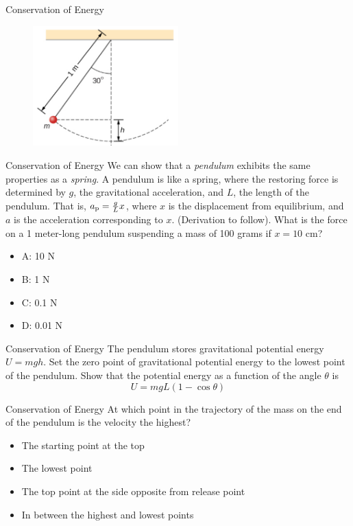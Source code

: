 \documentclass{beamer}
\begin{document}
\begin{frame}{Conservation of Energy}
\begin{figure}
\centering
\includegraphics[width=0.5\textwidth]{figures/pend.png}
\end{figure}
\end{frame}

\begin{frame}{Conservation of Energy}
We can show that a \textit{pendulum} exhibits the same properties as a \textit{spring}.  A pendulum is like a spring, where the restoring force is determined by $g$, the gravitational acceleration, and $L$, the length of the pendulum.  That is, $a_{\rm p} = \frac{g}{L}x$, where $x$ is the displacement from equilibrium, and $a$ is the acceleration corresponding to $x$.  (Derivation to follow).  What is the force on a 1 meter-long pendulum suspending a mass of 100 grams if $x=10$ cm?
\begin{itemize}
\item A: 10 N
\item B: 1 N
\item C: 0.1 N
\item D: 0.01 N
\end{itemize}
\end{frame}

\begin{frame}{Conservation of Energy}
The pendulum stores gravitational potential energy $U = mgh$.  Set the zero point of gravitational potential energy to the lowest point of the pendulum.  Show that the potential energy as a function of the angle $\theta$ is \\ \vspace{1cm}
\begin{equation}
U = mgL(1-\cos\theta)
\end{equation}
\end{frame}

\begin{frame}{Conservation of Energy}
At which point in the trajectory of the mass on the end of the pendulum is the velocity the highest?
\begin{itemize}
\item The starting point at the top
\item The lowest point
\item The top point at the side opposite from release point
\item In between the highest and lowest points
\end{itemize}
\end{frame}
\end{document}
